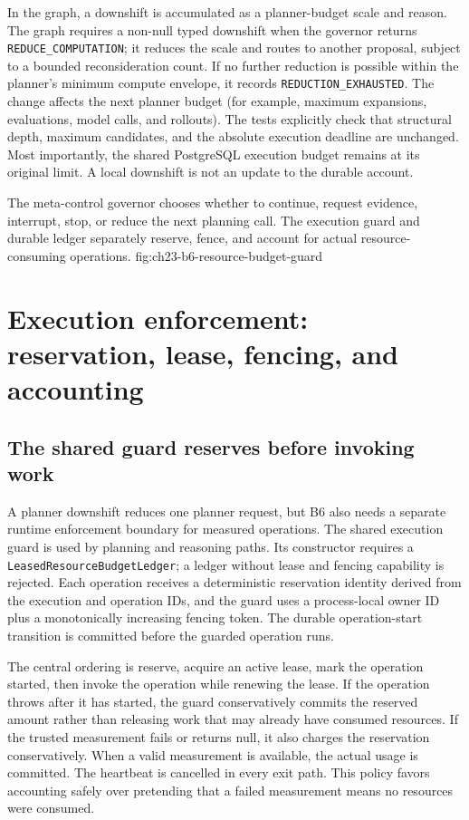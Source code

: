 In the graph, a downshift is accumulated as a planner-budget scale and reason. The graph requires a non-null typed downshift when the governor returns \texttt{REDUCE\_COMPUTATION}; it reduces the scale and routes to another proposal, subject to a bounded reconsideration count. If no further reduction is possible within the planner's minimum compute envelope, it records \texttt{REDUCTION\_EXHAUSTED}. The change affects the next planner budget (for example, maximum expansions, evaluations, model calls, and rollouts). The tests explicitly check that structural depth, maximum candidates, and the absolute execution deadline are unchanged. Most importantly, the shared PostgreSQL execution budget remains at its original limit. A local downshift is not an update to the durable account.

  {The meta-control governor chooses whether to continue, request evidence, interrupt, stop, or reduce the next planning call. The execution guard and durable ledger separately reserve, fence, and account for actual resource-consuming operations.}
  {fig:ch23-b6-resource-budget-guard}

\section{Execution enforcement: reservation, lease, fencing, and accounting}
\label{sec:ch23-execution-enforcement}

\subsection{The shared guard reserves before invoking work}
\label{subsec:ch23-budget-execution-guard}

A planner downshift reduces one planner request, but B6 also needs a separate runtime enforcement boundary for measured operations. The shared execution guard is used by planning and reasoning paths. Its constructor requires a \texttt{LeasedResourceBudgetLedger}; a ledger without lease and fencing capability is rejected. Each operation receives a deterministic reservation identity derived from the execution and operation IDs, and the guard uses a process-local owner ID plus a monotonically increasing fencing token. The durable operation-start transition is committed before the guarded operation runs.

The central ordering is reserve, acquire an active lease, mark the operation started, then invoke the operation while renewing the lease. If the operation throws after it has started, the guard conservatively commits the reserved amount rather than releasing work that may already have consumed resources. If the trusted measurement fails or returns null, it also charges the reservation conservatively. When a valid measurement is available, the actual usage is committed. The heartbeat is cancelled in every exit path. This policy favors accounting safely over pretending that a failed measurement means no resources were consumed.


